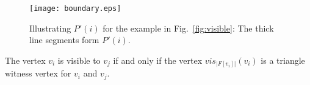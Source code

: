 \documentclass[11pt]{article}
\def\lemmaspace{\vspace*{0in}}
\begin{document}
\begin{figure}[t]
\begin{minipage}[t]{\linewidth}
\begin{center}
\texttt{[image: boundary.eps]}
\caption{\footnotesize Illustrating $P'(i)$ for the example in
Fig.~\ref{fig:visible}: The thick line segments form $P'(i)$. 
}\label{fig:boundary}
\end{center}
\end{minipage}
\end{figure}


\lemmaspace
\begin{lemma}\label{lem:20}
The vertex $v_i$ is visible to $v_j$ if and only if the vertex
$vis_{|F[v_i]|}(v_i)$ is a triangle witness vertex for $v_i$ and $v_j$. 
\end{lemma}
\lemmaspace
\end{document}
